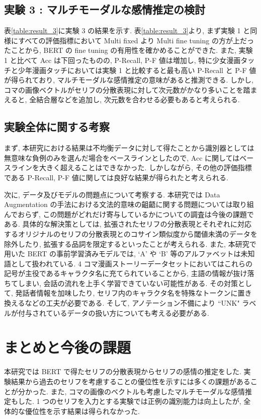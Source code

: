 \documentclass[twocolumn]{jarticle}     %
\begin{document}
\subsection{\small{実験 3 : マルチモーダルな感情推定の検討}}
表\ref{table:result_3}に実験 3 の結果を示す.
表\ref{table:result_3}より, まず実験 1 と同様にすべての評価指標において Multi fixed より Multi fine tuning の方が上だったことから, BERT の fine tuning の有用性を確かめることができた. また, 実験 1 と比べて Acc は下回ったものの, P-Recall, P-F 値は増加し, 特に少女漫画タッチと少年漫画タッチにおいては実験 1 と比較すると最も高い P-Recall と P-F 値が得られており, マルチモーダルな感情推定の意味があると推測できる. しかし, コマの画像ベクトルがセリフの分散表現に対して次元数がかなり多いことを踏まえると, 全結合層などを追加し, 次元数を合わせる必要もあると考えられる.

\subsection{\small{実験全体に関する考察}}
まず, 本研究における結果は不均衡データに対して得たことから識別器としては無意味な負例のみを選んだ場合をベースラインとしたので, Acc に関してはベースラインを大きく超えることはできなかった. しかしながら, その他の評価指標である P-Recall, P-F 値に関しては良好な結果が得られたと考えられる.

次に, データ及びモデルの問題点について考察する. 本研究では Data Augmentation の手法における文法的意味の齟齬に関する問題については取り組んでおらず, この問題がどれだけ寄与しているかについての調査は今後の課題である. 具体的な解決策としては, 拡張されたセリフの分散表現とそれぞれに対応するオリジナルのセリフの分散表現とのコサイン類似度から閾値未満のデータを除外したり, 拡張する品詞を限定するといったことが考えられる. また, 本研究で用いた BERT の事前学習済みモデルでは, `A' や `B' 等のアルファベットは未知語として扱われている. 4 コマ漫画ストーリーデータセットにおいてはこれらの記号が主役であるキャラクタ名に充てられていることから, 主語の情報が抜け落ちてしまい, 会話の流れを上手く学習できていない可能性がある. その対策として, 発話者情報を加味したり, セリフ内のキャラクタ名を特殊なトークンに置き換えるなどの工夫が必要である. そして, アノテーション不備により ``UNK" ラベルが付与されているデータの扱い方についても考える必要がある.


\section{まとめと今後の課題}
本研究では BERT で得たセリフの分散表現からセリフの感情の推定をした. 実験結果から過去のセリフを考慮することの優位性を示すには多くの課題があることが分かった. また, コマの画像のベクトルも考慮したマルチモーダルな感情推定もした. 1 つのセリフを入力とする実験では正例の識別能力は向上したが, 全体的な優位性を示す結果は得られなかった.
\end{document}
